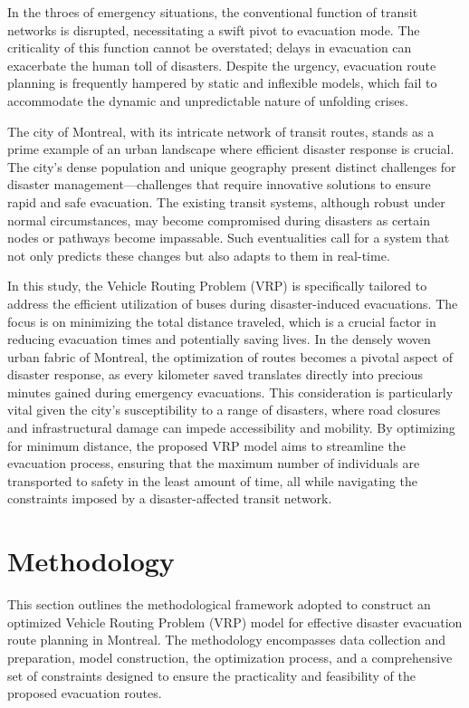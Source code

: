 \documentclass[12pt]{article}
\begin{document}
In the throes of emergency situations, the conventional function of transit networks is disrupted, necessitating a swift pivot to evacuation mode. The criticality of this function cannot be overstated; delays in evacuation can exacerbate the human toll of disasters. Despite the urgency, evacuation route planning is frequently hampered by static and inflexible models, which fail to accommodate the dynamic and unpredictable nature of unfolding crises.

The city of Montreal, with its intricate network of transit routes, stands as a prime example of an urban landscape where efficient disaster response is crucial. The city's dense population and unique geography present distinct challenges for disaster management—challenges that require innovative solutions to ensure rapid and safe evacuation. The existing transit systems, although robust under normal circumstances, may become compromised during disasters as certain nodes or pathways become impassable. Such eventualities call for a system that not only predicts these changes but also adapts to them in real-time.

In this study, the Vehicle Routing Problem (VRP) is specifically tailored to address the efficient utilization of buses during disaster-induced evacuations. The focus is on minimizing the total distance traveled, which is a crucial factor in reducing evacuation times and potentially saving lives. In the densely woven urban fabric of Montreal, the optimization of routes becomes a pivotal aspect of disaster response, as every kilometer saved translates directly into precious minutes gained during emergency evacuations. This consideration is particularly vital given the city's susceptibility to a range of disasters, where road closures and infrastructural damage can impede accessibility and mobility. By optimizing for minimum distance, the proposed VRP model aims to streamline the evacuation process, ensuring that the maximum number of individuals are transported to safety in the least amount of time, all while navigating the constraints imposed by a disaster-affected transit network.%

\section{Methodology}

This section outlines the methodological framework adopted to construct an optimized Vehicle Routing Problem (VRP) model for effective disaster evacuation route planning in Montreal. The methodology encompasses data collection and preparation, model construction, the optimization process, and a comprehensive set of constraints designed to ensure the practicality and feasibility of the proposed evacuation routes.
\end{document}
